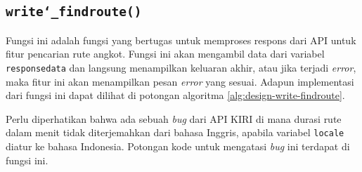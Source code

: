 \subsection{\texttt{write\char`_findroute()}}
\label{sec:design-code-write-findroute}

Fungsi ini adalah fungsi yang bertugas untuk memproses respons dari API untuk fitur pencarian rute angkot. Fungsi ini akan mengambil data dari variabel \verb|responsedata| dan langsung menampilkan keluaran akhir, atau jika terjadi \textit{error}, maka fitur ini akan menampilkan pesan \textit{error} yang sesuai. Adapun implementasi dari fungsi ini dapat dilihat di potongan algoritma \ref{alg:design-write-findroute}.

Perlu diperhatikan bahwa ada sebuah \textit{bug} dari API KIRI di mana durasi rute dalam menit tidak diterjemahkan dari bahasa Inggris, apabila variabel \verb|locale| diatur ke bahasa Indonesia. Potongan kode untuk mengatasi \textit{bug} ini terdapat di fungsi ini.

